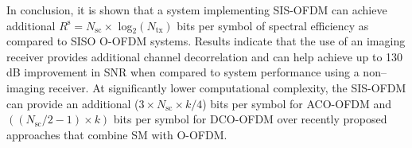 In conclusion, it is shown that a system implementing SIS-OFDM can achieve additional $R^{\text{s}}=N_{\text{sc}}\times $ log$^{ }_{2}(N_{\text{tx}})$ bits per symbol of spectral efficiency as compared to SISO O-OFDM systems. Results indicate that the use of an imaging receiver provides additional channel decorrelation and can help achieve up to 130 dB improvement in SNR when compared to system performance using a non--imaging receiver. At significantly lower computational complexity, the SIS-OFDM can provide an additional ($3\times N_{\text{sc}}\times k/4$) bits per symbol for ACO-OFDM and $((N_{\text{sc}}/2 -1)\times k)$ bits per symbol for DCO-OFDM over recently proposed approaches that combine SM with O-OFDM.
